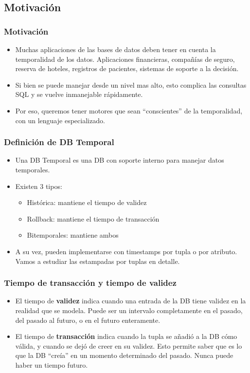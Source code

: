 \subsection{Motivación}

\begin{frame}
	\frametitle{Motivación}
	\begin{itemize}
	\item	Muchas aplicaciones de las bases de datos deben tener
		en cuenta la temporalidad de los datos. \pause
		Aplicaciones financieras, compañías de seguro, reserva
		de hoteles, registros de pacientes, sistemas de soporte
		a la decisión. \pause

	\item	Si bien se puede manejar desde un nivel mas alto, esto
		complica las consultas SQL y se vuelve inmanejable rápidamente.
		\pause

	\item	Por eso, queremos tener motores que sean ``conscientes'' de
		la temporalidad, con un lenguaje especializado.
	\end{itemize}
\end{frame}

\begin{frame}
\frametitle{Definición de DB Temporal}
	\begin{itemize}
	\item	Una DB Temporal es una DB con soporte interno para manejar
		datos temporales. \pause

	\item	Existen 3 tipos: \pause
		\begin{itemize}
		\item Histórica: mantiene el tiempo de validez \pause
		\item Rollback: mantiene el tiempo de transacción \pause
		\item Bitemporales: mantiene ambos \pause
		\end{itemize}

	\item	A su vez, pueden implementarse con timestamps por tupla
		o por atributo. Vamos a estudiar las estampadas por tuplas
		en detalle.
	\end{itemize}
\end{frame}

\begin{frame}
\frametitle{Tiempo de transacción y tiempo de validez}
	\begin{itemize}
	\item	El tiempo de {\bf validez} indica cuando una entrada de la DB
		tiene validez en la realidad que se modela. \pause Puede
		ser un intervalo completamente en el pasado, del pasado al
		futuro, o en el futuro enteramente.
	\pause
	\item	El tiempo de {\bf transacción} indica cuando la tupla se añadió
		a la DB cómo válida, y cuando se dejó de creer en su validez.
		\pause Esto permite saber que es lo que la DB ``creía'' en
		un momento determinado del pasado.
		\pause Nunca puede haber un tiempo futuro.
	\end{itemize}
\end{frame}

